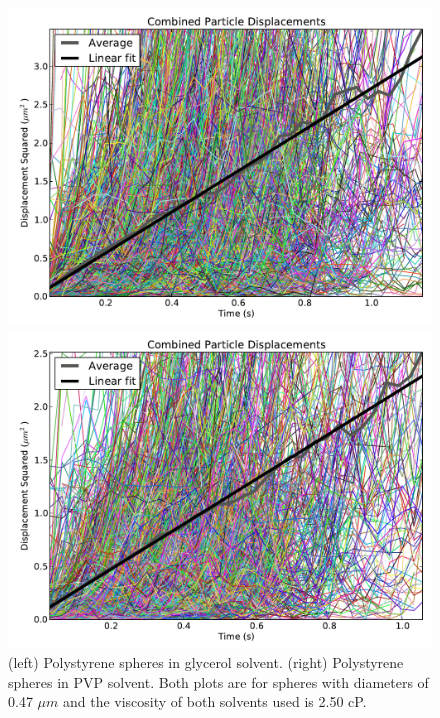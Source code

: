 \documentclass[11pt,letterpaper]{article}
\begin{document}
\begin{figure}
    \centering
    \begin{minipage}[t]{0.485\textwidth}
        \centering
        \includegraphics[width=\textwidth]{figures/d047_v250_G_1.pdf}
    \end{minipage}
    \begin{minipage}[t]{0.485\textwidth}
        \centering
        \includegraphics[width=\textwidth]{figures/d047_v250_P_1.pdf}
    \end{minipage}
    \caption{(left) Polystyrene spheres in glycerol solvent. (right) Polystyrene
    spheres in PVP solvent. Both plots are for spheres with diameters of 0.47
    $\mu m$ and the viscosity of both solvents used is 2.50 cP.}
    \label{polysphere}
\end{figure}
\ \\
\end{document}
